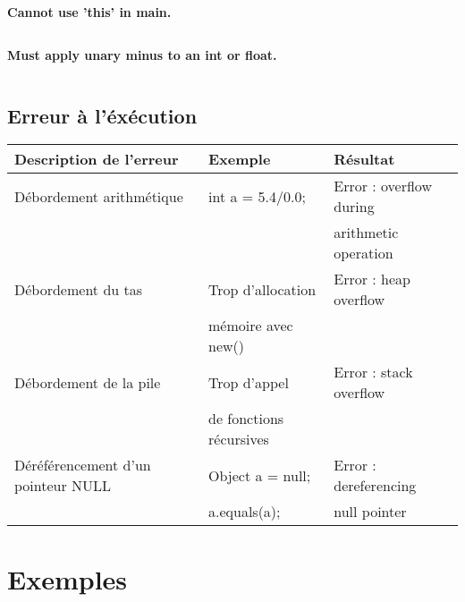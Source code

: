 \documentclass[a4,12pt]{article}
\begin{document}
\begin{lstlisting}

\end{lstlisting}




\textbf{Cannot use 'this' in main.}\\

\begin{lstlisting}

\end{lstlisting}




\textbf{Must apply unary minus to an int or float.}\\

\begin{lstlisting}

\end{lstlisting}



\subsection{Erreur à l'éxécution}
\begin{tabular}{|l|l|l|}
\hline
   Description de l'erreur & Exemple & Résultat \\
   \hline
   Débordement arithmétique & int a = 5.4/0.0; & Error : overflow during \\
      &  &  arithmetic operation \\
   \hline
   Débordement du tas & Trop d'allocation & Error : heap overflow \\
    &  mémoire avec new() &  \\
   \hline
   Débordement de la pile & Trop d'appel& Error : stack overflow \\
         & de fonctions récursives &\\
   
   \hline
   Déréférencement d'un pointeur NULL & Object a = null;  & Error : dereferencing  \\
   & a.equals(a); & null pointer \\
   \hline
\end{tabular}

\section{Exemples}
\end{document}
